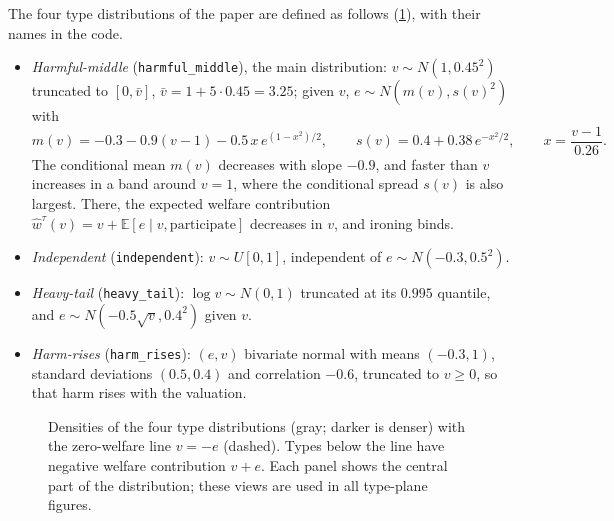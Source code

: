 \documentclass[11pt]{article}
\newcommand{\familydata}{data}
\newcommand{\pg}{\pgnum cm}
\newcommand{\bgimage}[2]{%
\addplot[forget plot] graphics[xmin=\csname eminImg#1\endcsname,xmax=\csname emaxImg#1\endcsname,ymin=\csname vminImg#1\endcsname,ymax=\csname vmaxImg#1\endcsname]{\familydata/#2.png};}
\newcommand{\formaxis}[3]{%
\nextgroupplot[title={#1},xmin=\csname emin#2\endcsname,xmax=\csname emax#2\endcsname,ymin=\csname vmin#2\endcsname,ymax=\csname vmax#2\endcsname,#3]}
\newcommand{\refline}[1]{\addplot[ref line,domain=\csname eminImg#1\endcsname:-\csname vmin#1\endcsname,samples=2,forget plot]{-x};}
\newcommand{\code}[1]{\texttt{#1}}
\begin{document}
The four type distributions of the paper are defined as follows (\cref{fig:types}), with their names in the code.
\begin{itemize}
    \item \emph{Harmful-middle} (\code{harmful\_middle}), the main distribution: $v\sim N(1,0.45^2)$ truncated to $[0,\bar v]$, $\bar v=1+5\cdot0.45=3.25$; given $v$, $e\sim N(m(v),s(v)^2)$ with
    \[
    m(v)=-0.3-0.9(v-1)-0.5\,x\,e^{(1-x^2)/2},\qquad s(v)=0.4+0.38\,e^{-x^2/2},\qquad x=\frac{v-1}{0.26}.
    \]
    The conditional mean $m(v)$ decreases with slope $-0.9$, and faster than $v$ increases in a band around $v=1$, where the conditional spread $s(v)$ is also largest. There, the expected welfare contribution $\hat w^\tau(v)=v+\mathbb{E}[e\mid v,\text{participate}]$ decreases in $v$, and ironing binds.
    \item \emph{Independent} (\code{independent}): $v\sim U[0,1]$, independent of $e\sim N(-0.3,0.5^2)$.
    \item \emph{Heavy-tail} (\code{heavy\_tail}): $\log v\sim N(0,1)$ truncated at its $0.995$ quantile, and $e\sim N(-0.5\sqrt v,0.4^2)$ given $v$.
    \item \emph{Harm-rises} (\code{harm\_rises}): $(e,v)$ bivariate normal with means $(-0.3,1)$, standard deviations $(0.5,0.4)$ and correlation $-0.6$, truncated to $v\geq0$, so that harm rises with the valuation.
\end{itemize}

\begin{figure}[htbp]
\centering
{}
\caption{Densities of the four type distributions (gray; darker is denser) with the zero-welfare line $v=-e$ (dashed). Types below the line have negative welfare contribution $v+e$. Each panel shows the central part of the distribution; these views are used in all type-plane figures.}
\label{fig:types}
\end{figure}
\end{document}
